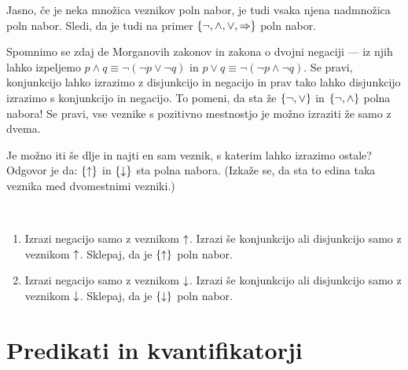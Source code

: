 		Jasno, če je neka množica veznikov poln nabor, je tudi vsaka njena nadmnožica poln nabor. Sledi, da je tudi na primer $\set{\lnot, \land, \lor, \impl}$ poln nabor.
		
		Spomnimo se zdaj de Morganovih zakonov in zakona o dvojni negaciji --- iz njih lahko izpeljemo $p \land q \equiv \lnot(\lnot{p} \lor \lnot{q})$ in $p \lor q \equiv \lnot(\lnot{p} \land \lnot{q})$. Se pravi, konjunkcijo lahko izrazimo z disjunkcijo in negacijo in prav tako lahko disjunkcijo izrazimo s konjunkcijo in negacijo. To pomeni, da sta že $\set{\lnot, \lor}$ in $\set{\lnot, \land}$ polna nabora! Se pravi, vse veznike s pozitivno mestnostjo je možno izraziti že samo z dvema.
		
		Je možno iti še dlje in najti en sam veznik, s katerim lahko izrazimo ostale? Odgovor je da: $\set{\shf}$ in $\set{\luk}$ sta polna nabora. (Izkaže se, da sta to edina taka veznika med dvomestnimi vezniki.)
		
		\begin{vaja}\label{VAJA: polni nabori z enim veznikom}
			\
			\begin{enumerate}
				\item
					Izrazi negacijo samo z veznikom $\mathbin{\uparrow}$. Izrazi še konjunkcijo ali disjunkcijo samo z veznikom $\mathbin{\uparrow}$. Sklepaj, da je $\set{\shf}$ poln nabor.
				\item
					Izrazi negacijo samo z veznikom $\mathbin{\downarrow}$. Izrazi še konjunkcijo ali disjunkcijo samo z veznikom $\mathbin{\downarrow}$. Sklepaj, da je $\set{\luk}$ poln nabor.
			\end{enumerate}
		\end{vaja}
		
		
	
	
	\section{Predikati in kvantifikatorji}
	

